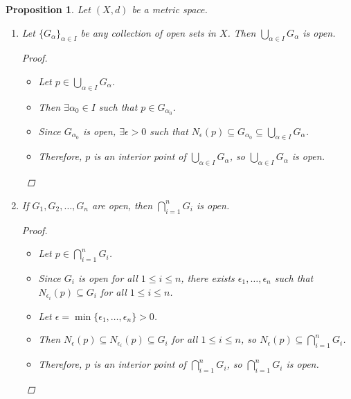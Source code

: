 \documentclass[10pt]{article}
\newtheorem{proposition}[theorem]{Proposition}
\theoremstyle{definition}
\theoremstyle{remark}
\begin{document}
\begin{proposition}
    Let $(X, d)$ be a metric space.
    \begin{enumerate}
        \item Let $\{G_\alpha\}_{\alpha \in I}$ be any collection of open sets in $X$. Then $\bigcup_{\alpha \in I} G_\alpha$ is open.
            \begin{proof}
                \hfill
                \begin{itemize}
                    \item Let $p \in \bigcup_{\alpha \in I} G_\alpha$. 
                    \item Then $\exists \alpha_0 \in I$ such that $p \in G_{\alpha_0}$. 
                    \item Since $G_{\alpha_0}$ is open, $\exists \epsilon > 0$ such that $N_\epsilon(p) \subseteq G_{\alpha_0} \subseteq \bigcup_{\alpha \in I} G_\alpha$.
                    \item Therefore, $p$ is an interior point of $\bigcup_{\alpha \in I} G_\alpha$, so $\bigcup_{\alpha \in I} G_\alpha$ is open.
                \end{itemize}
            \end{proof}
        \item If $G_1, G_2, \ldots, G_n$ are open, then $\bigcap_{i=1}^n G_i$ is open.
            \begin{proof}
                \hfill
                \begin{itemize}
                    \item Let $p \in \bigcap_{i=1}^n G_i$.
                    \item Since $G_i$ is open for all $1 \leq i \leq n$, there exists $\epsilon_1, \ldots, \epsilon_n$ such that
            $N_{\epsilon_i}(p) \subseteq G_i$ for all $1 \leq i \leq n$. 
                    \item Let $\epsilon = \min\{\epsilon_1, \ldots, \epsilon_n\} > 0$.
                    \item Then $N_\epsilon(p) \subseteq N_{\epsilon_i}(p) \subseteq G_i$ for all $1 \leq i \leq n$, so $N_\epsilon(p) \subseteq \bigcap_{i=1}^n G_i$.
                    \item Therefore, $p$ is an interior point of $\bigcap_{i=1}^n G_i$, so $\bigcap_{i=1}^n G_i$ is open.
                \end{itemize}
            \end{proof}
    \end{enumerate}
\end{proposition}
\end{document}
